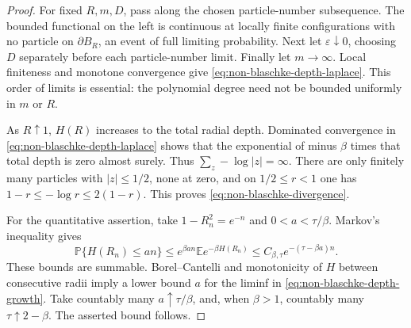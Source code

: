 \documentclass[11pt,a4paper]{article}
\numberwithin{equation}{section}
\theoremstyle{definition}
\theoremstyle{remark}
\newcommand{\E}{\mathbb E}
\begin{document}
\begin{proof}
For fixed $R,m,D$, pass along the chosen particle-number
subsequence. The bounded functional on the left is continuous at
locally finite configurations with no particle on $\partial B_R$,
an event of full limiting probability. Next let
$\varepsilon\downarrow0$, choosing $D$ separately before each
particle-number limit. Finally let $m\to\infty$. Local finiteness
and monotone convergence give
\eqref{eq:non-blaschke-depth-laplace}. This order of limits is
essential: the polynomial degree need not be bounded uniformly in
$m$ or $R$.

As $R\uparrow1$, $H(R)$ increases to the total radial depth.
Dominated convergence in \eqref{eq:non-blaschke-depth-laplace}
shows that the exponential of minus $\beta$ times that total depth
is zero almost surely. Thus $\sum_z-\log|z|=\infty$.
There are only finitely many particles with $|z|\le1/2$, none at
zero, and on $1/2\le r<1$ one has
$1-r\le-\log r\le2(1-r)$. This proves
\eqref{eq:non-blaschke-divergence}.

For the quantitative assertion, take $1-R_n^2=e^{-n}$ and
$0<a<\tau/\beta$. Markov's inequality gives
\[
 \mathbb P\{H(R_n)\le an\}
 \le e^{\beta an}\E e^{-\beta H(R_n)}
 \le C_{\beta,\tau}e^{-(\tau-\beta a)n}.
\]
These bounds are summable. Borel--Cantelli and monotonicity of $H$
between consecutive radii imply a lower bound $a$ for the liminf
in \eqref{eq:non-blaschke-depth-growth}. Take countably many
$a\uparrow\tau/\beta$, and, when $\beta>1$, countably many
$\tau\uparrow2-\beta$. The asserted bound follows.
\end{proof}
\end{document}
